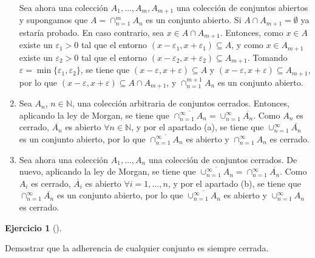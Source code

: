 \documentclass[
  a4paper,
]{scrreport}
\theoremstyle{definition}
\newtheorem{exercise}{Ejercicio}[chapter]
\theoremstyle{remark}
\begin{document}
\begin{tcolorbox}
\begin{enumerate}
  Sea ahora una colección \(A_1,\ldots,A_m,A_{m+1}\) una colección de
  conjuntos abiertos y supongamos que \(A=\cap_{n=1}^m A_n\) es un
  conjunto abierto. Si \(A\cap A_{m+1}=\emptyset\) ya estaría probado.
  En caso contrario, sea \(x\in A\cap A_{m+1}\). Entonces, como
  \(x\in A\) existe un \(\varepsilon_1>0\) tal que el entorno
  \((x-\varepsilon_1, x+\varepsilon_1)\subseteq A\), y como
  \(x\in A_{m+1}\) existe un \(\varepsilon_2>0\) tal que el entorno
  \((x-\varepsilon_2, x+\varepsilon_2)\subseteq A_{m+1}\). Tomando
  \(\varepsilon=\min\{\varepsilon_1,\varepsilon_2\}\), se tiene que
  \((x-\varepsilon, x+\varepsilon)\subseteq A\) y
  \((x-\varepsilon, x+\varepsilon)\subseteq A_{m+1}\), por lo que
  \((x-\varepsilon, x+\varepsilon)\subseteq A\cap A_{m+1}\), y
  \(\cap_{n=1}^{m+1} A_n\) es un conjunto abierto.
\item
  Sea \(A_n\), \(n\in\mathbb{N}\), una colección arbitraria de conjuntos
  cerrados. Entonces, aplicando la ley de Morgan, se tiene que
  \(\overline{\cap_{n=1}^\infty A_n}= \cup_{n=1}^\infty \overline{A_n}\).
  Como \(A_n\) es cerrado, \(\overline{A_n}\) es abierto
  \(\forall n\in\mathbb{N}\), y por el apartado (a), se tiene que
  \(\cup_{n=1}^\infty \overline{A_n}\) es un conjunto abierto, por lo
  que \(\overline{\cap_{n=1}^\infty A_n}\) es abierto y
  \(\cap_{n=1}^\infty A_n\) es cerrado.
\item
  Sea ahora una colección \(A_1,\ldots,A_n\) una colección de conjuntos
  cerrados. De nuevo, aplicando la ley de Morgan, se tiene que
  \(\overline{\cup_{n=1}^\infty A_n}= \cap_{n=1}^\infty \overline{A_n}\).
  Como \(A_i\) es cerrado, \(\overline{A_i}\) es abierto
  \(\forall i=1, \ldots, n\), y por el apartado (b), se tiene que
  \(\cap_{n=1}^\infty \overline{A_n}\) es un conjunto abierto, por lo
  que \(\overline{\cup_{n=1}^\infty A_n}\) es abierto y
  \(\cup_{n=1}^\infty A_n\) es cerrado.
\end{enumerate}

\end{tcolorbox}

\begin{exercise}[]\protect\hypertarget{exr-adherencia-cerrada}{}\label{exr-adherencia-cerrada}

Demostrar que la adherencia de cualquier conjunto es siempre cerrada.

\end{exercise}
\end{document}
